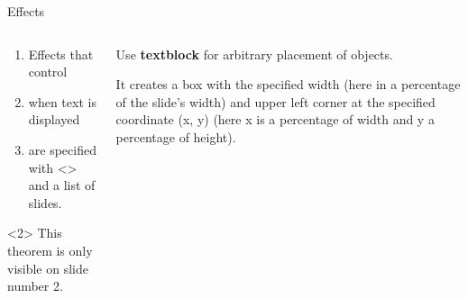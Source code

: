 \documentclass[aspectratio=169]{beamer}
\begin{document}
\begin{frame}{Effects}
    \begin{columns}[onlytextwidth]
        \begin{column}{0.49\textwidth}
            \begin{enumerate}[<+-|alert@+>]
                \item
                Effects that control

                \item
                when text is displayed

                \item
                are specified with <> and a list of slides.
            \end{enumerate}

            \begin{theorem}<2>
                This theorem is only visible on slide number 2.
            \end{theorem}
        \end{column}
        \begin{column}{0.49\textwidth}
            Use \textbf<2->{textblock} for arbitrary placement of objects.

            \pause
            \medskip

            It creates a box
            with the specified width (here in a percentage of the slide's width)
            and upper left corner at the specified coordinate (x, y)
            (here x is a percentage of width and y a percentage of height).
        \end{column}
    \end{columns}
\end{frame}
\end{document}
